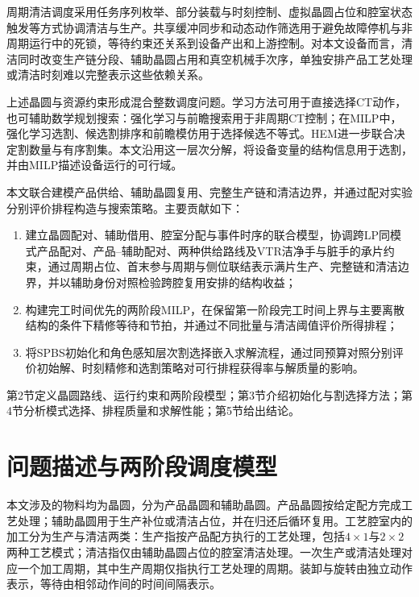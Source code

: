 \documentclass[final,5p,times,twocolumn]{elsarticle}
\begin{document}
周期清洁调度采用任务序列枚举、部分装载与时刻控制、虚拟晶圆占位和腔室状态触发等方式协调清洁与生产\citep{kim2013cleaning,yu2020delay,qiao2022binary,li2022conditioncleaning}。共享缓冲同步和动态动作筛选用于避免故障停机与非周期运行中的死锁\citep{zhu2025failuredeadlock,kim2025noncyclicdeadlock}，等待约束还关系到设备产出和上游控制\citep{lee2018waiting}。对本文设备而言，清洁同时改变生产链分段、辅助晶圆占用和真空机械手次序，单独安排产品工艺处理或清洁时刻难以完整表示这些依赖关系。

上述晶圆与资源约束形成混合整数调度问题。学习方法可用于直接选择CT动作，也可辅助数学规划搜索：强化学习与前瞻搜索用于非周期CT控制\citep{kim2025adaptivecluster}；在MILP中，强化学习选割、候选割排序和前瞻模仿用于选择候选不等式\citep{tang2020cut,huang2022cutranking,paulus2022looking}。HEM进一步联合决定割数量与有序割集\citep{wang2023hem}。本文沿用这一层次分解，将设备变量的结构信息用于选割，并由MILP描述设备运行的可行域。

本文联合建模产品供给、辅助晶圆复用、完整生产链和清洁边界，并通过配对实验分别评价排程构造与搜索策略。主要贡献如下：
\begin{enumerate}[leftmargin=*]
\item 建立晶圆配对、辅助借用、腔室分配与事件时序的联合模型，协调跨LP同模式产品配对、产品--辅助配对、两种供给路线及VTR洁净手与脏手的承片约束，通过周期占位、首末参与周期与侧位联结表示满片生产、完整链和清洁边界，并以辅助身份对照检验跨腔复用安排的结构收益；
\item 构建完工时间优先的两阶段MILP，在保留第一阶段完工时间上界与主要离散结构的条件下精修等待和节拍，并通过不同批量与清洁阈值评价所得排程；
\item 将SPBS初始化和角色感知层次割选择嵌入求解流程，通过同预算对照分别评价初始解、时刻精修和选割策略对可行排程获得率与解质量的影响。
\end{enumerate}

第2节定义晶圆路线、运行约束和两阶段模型；第3节介绍初始化与割选择方法；第4节分析模式选择、排程质量和求解性能；第5节给出结论。

\section{问题描述与两阶段调度模型}
\setcounter{equation}{0}

本文涉及的物料均为晶圆，分为产品晶圆和辅助晶圆。产品晶圆按给定配方完成工艺处理；辅助晶圆用于生产补位或清洁占位，并在归还后循环复用。工艺腔室内的加工分为生产与清洁两类：生产指按产品配方执行的工艺处理，包括$4\times1$与$2\times2$两种工艺模式；清洁指仅由辅助晶圆占位的腔室清洁处理。一次生产或清洁处理对应一个加工周期，其中生产周期仅指执行工艺处理的周期。装卸与旋转由独立动作表示，等待由相邻动作间的时间间隔表示。
\end{document}
